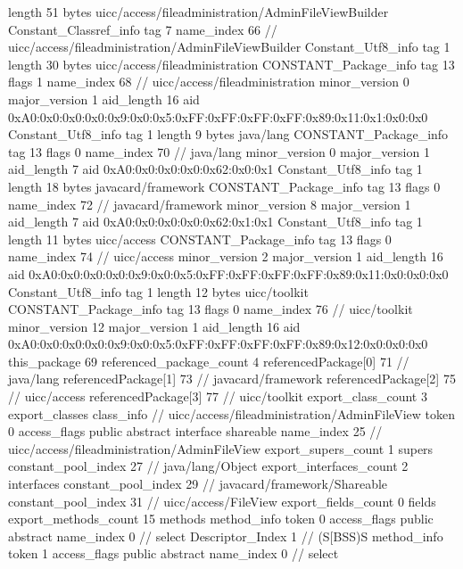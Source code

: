 {{{			length	51
			bytes	uicc/access/fileadministration/AdminFileViewBuilder
		}
		Constant_Classref_info {
			tag	7
			name_index	66		// uicc/access/fileadministration/AdminFileViewBuilder
		}
		Constant_Utf8_info {
			tag	1
			length	30
			bytes	uicc/access/fileadministration
		}
		CONSTANT_Package_info {
			tag	13
			flags	1
			name_index	68		// uicc/access/fileadministration
			minor_version	0
			major_version	1
			aid_length	16
			aid	0xA0:0x0:0x0:0x0:0x9:0x0:0x5:0xFF:0xFF:0xFF:0xFF:0x89:0x11:0x1:0x0:0x0
		}
		Constant_Utf8_info {
			tag	1
			length	9
			bytes	java/lang
		}
		CONSTANT_Package_info {
			tag	13
			flags	0
			name_index	70		// java/lang
			minor_version	0
			major_version	1
			aid_length	7
			aid	0xA0:0x0:0x0:0x0:0x62:0x0:0x1
		}
		Constant_Utf8_info {
			tag	1
			length	18
			bytes	javacard/framework
		}
		CONSTANT_Package_info {
			tag	13
			flags	0
			name_index	72		// javacard/framework
			minor_version	8
			major_version	1
			aid_length	7
			aid	0xA0:0x0:0x0:0x0:0x62:0x1:0x1
		}
		Constant_Utf8_info {
			tag	1
			length	11
			bytes	uicc/access
		}
		CONSTANT_Package_info {
			tag	13
			flags	0
			name_index	74		// uicc/access
			minor_version	2
			major_version	1
			aid_length	16
			aid	0xA0:0x0:0x0:0x0:0x9:0x0:0x5:0xFF:0xFF:0xFF:0xFF:0x89:0x11:0x0:0x0:0x0
		}
		Constant_Utf8_info {
			tag	1
			length	12
			bytes	uicc/toolkit
		}
		CONSTANT_Package_info {
			tag	13
			flags	0
			name_index	76		// uicc/toolkit
			minor_version	12
			major_version	1
			aid_length	16
			aid	0xA0:0x0:0x0:0x0:0x9:0x0:0x5:0xFF:0xFF:0xFF:0xFF:0x89:0x12:0x0:0x0:0x0
		}
	}
	this_package	69
	referenced_package_count	4
	referencedPackage[0]	71		// java/lang
	referencedPackage[1]	73		// javacard/framework
	referencedPackage[2]	75		// uicc/access
	referencedPackage[3]	77		// uicc/toolkit
	export_class_count	3
	export_classes {
		class_info {		// uicc/access/fileadministration/AdminFileView
			token	0
			access_flags	public abstract interface shareable
			name_index	25		// uicc/access/fileadministration/AdminFileView
			export_supers_count	1
			supers {
				constant_pool_index	27		// java/lang/Object
			}
			export_interfaces_count	2
			interfaces {
				constant_pool_index	29		// javacard/framework/Shareable
				constant_pool_index	31		// uicc/access/FileView
			}
			export_fields_count	0
			fields {
			}
			export_methods_count	15
			methods {
				method_info {
					token	0
					access_flags	public abstract
					name_index	0		// select
					Descriptor_Index	1		// (S[BSS)S
				}
				method_info {
					token	1
					access_flags	public abstract
					name_index	0		// select
}}}}}
